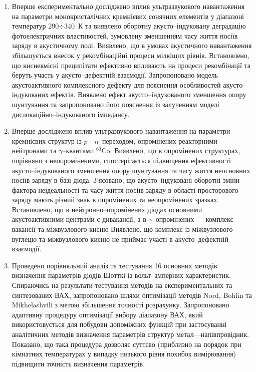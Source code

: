 \begin{enumerate}[leftmargin=0cm,itemindent=3em]
  \item Вперше експериментально досліджено вплив ультразвукового навантаження на параметри монокристалічних кремнієвих сонячних елементів у діапазоні температур 290$\div$340~К
  та виявлено оборотну акусто--індуковану деградацію фотоелектричних властивостей, зумовлену зменшенням часу життя носіїв заряду в акустичному полі.
  Виявлено, що в умовах акустичного навантаження збільшується внесок у рекомбінаційні процеси мілкіших рівнів.
  Встановлено, що кисневмісні преципітати ефективно впливають на процеси рекомбінації та беруть участь у акусто--дефектній взаємодії.
  Запропоновано модель акустоактивного комплексного дефекту для пояснення особливостей акусто--індукованих ефектів.
 Виявлено ефект акусто--індукованого зменшення  опору шунтування та запропоновано його пояснення із залученням моделі дислокаційно--індукованого імпедансу.

\item Вперше досліджено вплив ультразвукового навантаження на параметри кремнієвих структур із $p$---$n$--переходом, опромінених реакторними нейтронами та $\gamma$--квантами $^{60}$Co.
      Виявлено, що в опромінених структурах, порівняно з неопроміненими, спостерігається підвищення ефективності акусто--індукованого зменшення  опору шунтування та часу життя неосновних носіїв заряду в базі діода.
      З'ясовано, що акусто--індуковані оборотні зміни фактора неідеальності та часу життя носіїв заряду в області просторового заряду   мають різний знак в опромінених та неопромінених зразках.
      Встановлено, що в нейтронно--опромінених діодах основними акустоактивними центрами є дивакансії,
      а в $\gamma$--опромінених --- комплекс вакансії та міжвузлового кисню
     Виявлено, що комплекс із міжвузлового вуглецю та міжвузлового кисню не приймає участі в акусто--дефектній взаємодії.

\item  Проведено порівняльний аналіз та тестування 16 основних методів визначення параметрів діодів Шотткі із вольт--амперних характеристик.
         Спираючись на результати тестування методів на експериментальних та синтезованих  ВАХ,
         запропоновано шляхи оптимізації методів Nord, Bohlin та Mikhelashvili з метою збільшення точності розрахунку.
      Запропоновано адаптивну процедуру оптимізації вибору діапазону ВАХ, який використовується для побудови допоміжних функцій при застосуванні аналітичних методів визначення параметрів структур метал---напівпровідник.
       Показано, що така процедура дозволяє суттєво (приблизно на порядок при кімнатних температурах у випадку низького рівня похибок вимірювання) підвищити точність визначення параметрів.


\end{enumerate}
